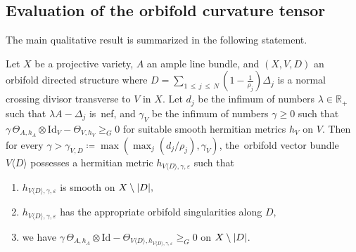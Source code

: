 \documentclass[AHL,Unicode,longabstracts,published]{cedram}
\DeclarePairedDelimiter{\abs}{\lvert}{\rvert}
\newcommand*\Id{\mathrm{Id}}
\newcommand*\bR{\mathbb{R}}
\let\leq\leqslant
\let\geq\geqslant
\newcommand*\bydef{\coloneqq}
\begin{document}
\subsection{Evaluation of the orbifold curvature tensor}\label{sse:orbi_metric}
The main qualitative result is summarized in the following statement.
\begin{prop}\label{prop:orbi_metric}
Let $X$ be a projective variety, $A$ an ample line bundle, and $(X,V,D)$ an orbifold directed structure where
$D=\sum_{1\,\leq\,j\,\leq\,N}(1-\tfrac{1}{\rho_j})\Delta_j$ is a normal crossing divisor transverse to $V$ in $X$. Let $d_j$ be the infimum of numbers
$\lambda\in\bR_+$ such that $\lambda A-\Delta_j$ is~nef, and $\gamma_V$ be the infimum of numbers $\gamma\geq 0$ such that $\gamma\,
\Theta_{A,h_A}\otimes\Id_V-\Theta_{V,h_V}\geq_G0$ for suitable smooth hermitian metrics $h_V$ on $V$. Then for every
$\gamma>\gamma_{V,D}\bydef\max(\max_j(d_j/\rho_j),\gamma_V)$, the~orbifold vector bundle $V\langle D\rangle$ possesses a hermitian metric $h_{V\langle D\rangle,\gamma,\varepsilon}$ such that
\begin{enumerate}
\item
$h_{V\langle D\rangle,\gamma,\varepsilon}$ is smooth on $X\setminus\abs{D},$
\item
$h_{V\langle D\rangle,\gamma,\varepsilon}$ has the appropriate orbifold singularities along $D,$
\item we have $\gamma\,\Theta_{A,h_A}\otimes\Id-
\Theta_{V\langle D\rangle,h_{V\langle D\rangle,\gamma,\varepsilon}}\geq_G0$ on $X\setminus\abs{D}$.
\end{enumerate}
\end{prop}
\end{document}
